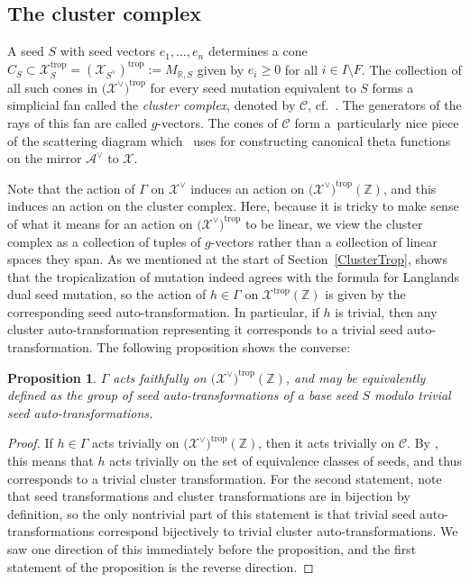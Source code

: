 \documentclass[10pt,a4paper]{amsart}
\numberwithin{equation}{section}
\numberwithin{figure}{section}
\numberwithin{table}{section}
\DeclareMathOperator{\trop}{trop}
\let\bb=\mathbb
\let\s=\mathcal
\newtheorem{prop}[thm]{Proposition}
\theoremstyle{definition}
\begin{document}
\subsection{The cluster complex}\label{ClusterComplex}
A seed $S$ with seed vectors $e_1,\dots,e_n$ determines a cone $C_S \subset \s{X}_S^{\trop}=(\s{X}_{S^{\vee}})^{\trop}:=M_{\bb{R},S}$ given by $e_i \geq 0$ for all $i\in I\setminus F$. The collection of all such cones in $\big(\s{X}^{\vee}\big)^{\trop}$ for every seed mutation equivalent to $S$ forms a simplicial fan called the {\it cluster complex}, denoted by $\s{C}$, cf.\ \cite[Theorem~0.8]{GHKK}. The generators of the rays of this fan are called $g$-vectors. The cones of $\s{C}$ form a~particularly nice piece of the scattering diagram which~\cite{GHKK} uses for constructing canonical theta functions on the mirror $\s{A}^{\vee}$ to $\s{X}$.

Note that the action of $\Gamma$ on $\s{X}^{\vee}$ induces an action on $\big(\s{X}^{\vee}\big)^{\trop}(\bb{Z})$, and this induces an action on the cluster complex. Here, because it is tricky to make sense of what it means for an action on $\big(\s{X}^{\vee}\big)^{\trop}$ to be linear, we view the cluster complex as a collection of tuples of $g$-vectors rather than a collection of linear spaces they span. As we mentioned at the start of Section~\ref{ClusterTrop}, \cite{GHK3} shows that the tropicalization of mutation indeed agrees with the formula for Langlands dual seed mutation, so the action of $h\in \Gamma$ on $\s{X}^{\trop}(\bb{Z})$ is given by the corresponding seed auto-transformation. In particular, if $h$ is trivial, then any cluster auto-transformation representing it corresponds to a trivial seed auto-transformation. The following proposition shows the converse:

\begin{prop}\label{TropClust}
$\Gamma$ acts faithfully on $\big(\s{X}^{\vee}\big)^{\trop}(\bb{Z})$, and may be equivalently defined as the group of seed auto-transformations of a base seed $S$ modulo trivial seed auto-transformations.
\end{prop}
\begin{proof}If $h \in \Gamma$ acts trivially on $\big(\s{X}^{\vee}\big)^{\trop}(\bb{Z})$, then it acts trivially on $\s{C}$. By \cite[Theorem~0.8]{GHKK}, this means that $h$ acts trivially on the set of equivalence classes of seeds, and thus corresponds to a trivial cluster transformation. For the second statement, note that seed transformations and cluster transformations are in bijection by definition, so the only nontrivial part of this statement is that trivial seed auto-transformations correspond bijectively to trivial cluster auto-transformations. We saw one direction of this immediately before the proposition, and the first statement of the proposition is the reverse direction.
\end{proof}
\end{document}
